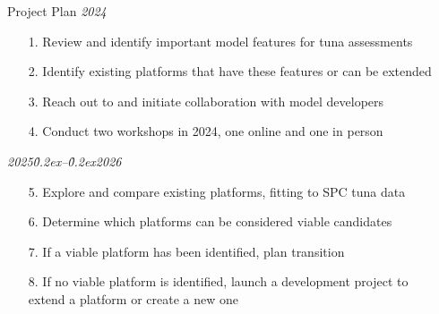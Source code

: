\documentclass[aspectratio=169,fleqn]{beamer}
\begin{document}
\begin{frame}{Project Plan}\small
  \textit{2024}
  \begin{itemize}
    \item[1.] Review and identify important model features for tuna
    assessments\\[-1ex]
    \item[2.] Identify existing platforms that have these features or can be
    extended\\[-1ex]
    \item[3.] Reach out to and initiate collaboration with model
    developers\\[-1ex]
    \item[4.] Conduct two workshops in 2024, one online and one in person\\[4ex]
  \end{itemize}
  \textit{2025\h{0.2ex}--\h{0.2ex}2026}
  \begin{itemize}
    \item[5.] Explore and compare existing platforms, fitting to SPC tuna
    data\\[-1ex]
    \item[6.] Determine which platforms can be considered viable
    candidates\\[-1ex]
    \item[7.] If a viable platform has been identified, plan transition\\[-1ex]
    \item[8.] If no viable platform is identified, launch a development project
    to\\[0.1ex]
    extend a platform or create a new one
  \end{itemize}
\end{frame}


\begin{frame}[plain]
\end{frame}

\end{document}

